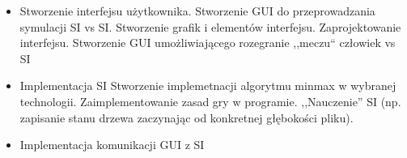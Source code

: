
\begin{itemize}
	\item Stworzenie interfejsu użytkownika.
	\subitem{-} Stworzenie GUI do przeprowadzania symulacji SI vs SI.
	\subitem{-} Stworzenie grafik i elementów interfejsu.
	\subitem{-} Zaprojektowanie interfejsu.
	\subitem{-} Stworzenie GUI umożliwiającego rozegranie ,,meczu`` człowiek vs SI
	\item Implementacja SI
	\subitem{-} Stworzenie implemetnacji algorytmu minmax w wybranej technologii.
	\subitem{-} Zaimplementowanie zasad gry w programie.
	\subitem{-} ,,Nauczenie'' SI (np. zapisanie stanu drzewa zaczynając od konkretnej głębokości pliku).
	\item Implementacja komunikacji GUI z SI
\end{itemize}